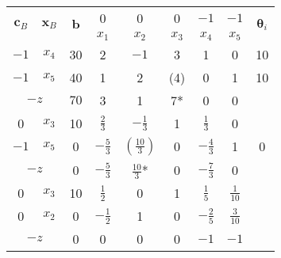 \begin{table}[ht]
    \centering
    \caption{}
    \label{table:10-2}
    \begin{tabular}{|c|c|c|c|c|c|c|c|c|}
        \hline
        \multirow{2}{*}{$\bm{c}_B$} & \multirow{2}{*}{$\bm{x}_B$} & \multirow{2}{*}{$\bm{b}$} & \multicolumn{1}{c}{0} & \multicolumn{1}{c}{0} & \multicolumn{1}{c}{0} & \multicolumn{1}{c}{$-1$} & $-1$ & \multirow{2}{*}{$\bm{\theta}_i$} \\
        \cline{4-8}
        &&& \multicolumn{1}{c}{$x_1$} & \multicolumn{1}{c}{$x_2$} & \multicolumn{1}{c}{$x_3$} & \multicolumn{1}{c}{$x_4$} & $x_5$ & \\
        \hline
        $-1$ & $x_4$ & 30 & \multicolumn{1}{c}{2} & \multicolumn{1}{c}{$-1$} & \multicolumn{1}{c}{\cellcolor{LightBlue1}3} & \multicolumn{1}{c}{1} & 0 & 10 \\
        \cline{1-3}
        $-1$ & {\color{red}$x_5$} & 40 & \multicolumn{1}{c}{1} & \multicolumn{1}{c}{2} & \multicolumn{1}{c}{\cellcolor{LightBlue1}\color{red}(4)} & \multicolumn{1}{c}{0} & 1 & {\color{red}10} \\
        \hline
        \multicolumn{2}{|c|}{$-z$} & $70$ & \multicolumn{1}{c}{3} & \multicolumn{1}{c}{1} & \multicolumn{1}{c}{\cellcolor{LightBlue1}\color{red}7*} & \multicolumn{1}{c}{0} & 0 & \\

        \hline

        0 & $x_3$ & 10 & \multicolumn{1}{c}{$\tfrac{2}{3}$} & \multicolumn{1}{c}{\cellcolor{LightBlue1}$-\tfrac{1}{3}$} & \multicolumn{1}{c}{1} & \multicolumn{1}{c}{$\tfrac{1}{3}$} & 0 & \\
        \cline{1-3}
        $-1$ & {\color{red}$x_5$} & 0 & \multicolumn{1}{c}{$-\tfrac{5}{3}$} & \multicolumn{1}{c}{\cellcolor{LightBlue1}\color{red}$\left(\tfrac{10}{3}\right)$} & \multicolumn{1}{c}{0} & \multicolumn{1}{c}{$-\tfrac{4}{3}$} & 1 & {\color{red}0} \\
        \hline
        \multicolumn{2}{|c|}{$-z$} & 0 & \multicolumn{1}{c}{$-\tfrac{5}{3}$} & \multicolumn{1}{c}{\cellcolor{LightBlue1}\color{red}$\tfrac{10}{3}$*} & \multicolumn{1}{c}{0} & \multicolumn{1}{c}{$-\tfrac{7}{3}$} & 0 & \\

        \hline

        0 & $x_3$ & 10 & \multicolumn{1}{c}{$\tfrac{1}{2}$} & \multicolumn{1}{c}{0} & \multicolumn{1}{c}{1} & \multicolumn{1}{c}{$\tfrac{1}{5}$} & $\tfrac{1}{10}$ & \\
        \cline{1-3}
        0 & $x_2$ & 0 & \multicolumn{1}{c}{$-\tfrac{1}{2}$} & \multicolumn{1}{c}{1} & \multicolumn{1}{c}{0} & \multicolumn{1}{c}{$-\tfrac{2}{5}$} & $\tfrac{3}{10}$ & \\
        \hline
        \multicolumn{2}{|c|}{$-z$} & 0 & \multicolumn{1}{c}{0} & \multicolumn{1}{c}{0} & \multicolumn{1}{c}{0} & \multicolumn{1}{c}{$-1$} & $-1$ & \\

        \hline
    \end{tabular}
\end{table}
